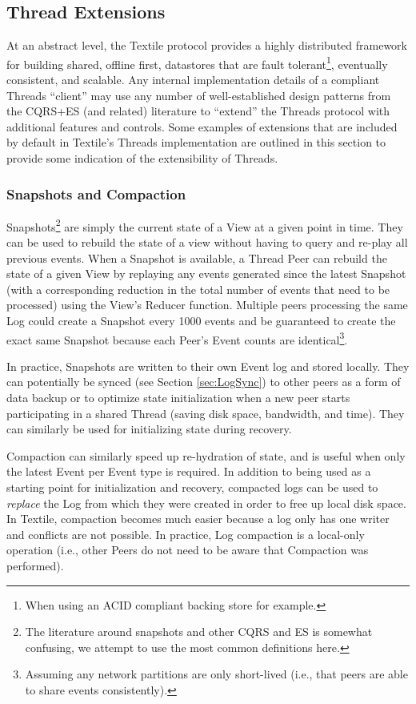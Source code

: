 \documentclass{textile}
\begin{document}
\subsection{Thread Extensions}

At an abstract level, the Textile protocol provides a highly distributed framework for building shared, offline first, datastores that are fault tolerant\footnote{When using an ACID compliant backing store for example.}, eventually consistent, and scalable. Any internal implementation details of a compliant Threads ``client'' may use any number of well-established design patterns from the CQRS+ES (and related) literature to ``extend'' the Threads protocol with additional features and controls. Some examples of extensions that are included by default in Textile's Threads implementation are outlined in this section to provide some indication of the extensibility of Threads.

\subsubsection{Snapshots and Compaction}\label{sec:SnapshotsCompaction}

Snapshots\footnote{The literature around snapshots and other CQRS and ES is somewhat confusing, we attempt to use the most common definitions here.} are simply the current state of a View at a given point in time. They can be used to rebuild the state of a view without having to query and re-play all previous events. When a Snapshot is available, a Thread Peer can rebuild the state of a given View by replaying any events generated since the latest Snapshot (with a corresponding reduction in the total number of events that need to be processed) using the View's Reducer function. Multiple peers processing the same Log could create a Snapshot every 1000 events and be guaranteed to create the exact same Snapshot because each Peer's Event counts are identical\footnote{Assuming any network partitions are only short-lived (i.e., that peers are able to share events consistently).}. 

In practice, Snapshots are written to their own Event log and stored locally. They can potentially be synced (see Section \ref{sec:LogSync}) to other peers as a form of data backup or to optimize state initialization when a new peer starts participating in a shared Thread (saving disk space, bandwidth, and time). They can similarly be used for initializing state during recovery.

Compaction can similarly speed up re-hydration of state, and is useful when only the latest Event per Event type is required. In addition to being used as a starting point for initialization and recovery, compacted logs can be used to \emph{replace} the Log from which they were created in order to free up local disk space. In Textile, compaction becomes much easier because a log only has one writer and conflicts are not possible. In practice, Log compaction is a local-only operation (i.e., other Peers do not need to be aware that Compaction was performed).
\end{document}
